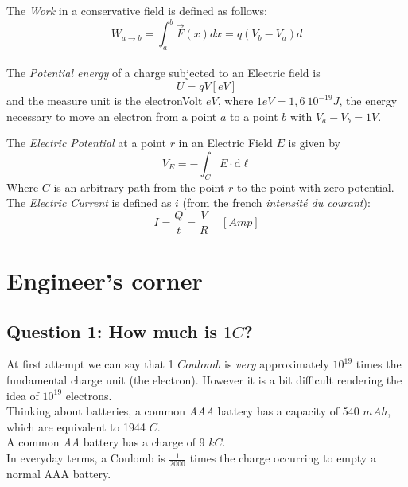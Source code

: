 \documentclass[12pt]{article}
\newcommand{\I}{\textit}
\begin{document}
 The \I{Work} in a conservative field is defined as follows:
		\begin{equation}
			W_{a\to b} = \int_{a}^{b} \overrightarrow{F}(x)dx = q (V_b - V_a)d
		\end{equation}\\
 The \I{Potential energy} of a charge subjected to an Electric field is 
	\begin{equation}
		U = q V [eV]
	\end{equation} and the measure unit is the electronVolt $eV$, where $1 eV = 1,6 \ 10^{-19} J$, the energy necessary to move an electron from a point $a$ to a point $b$ with $V_a-V_b= 1 V$.

The \I{Electric Potential} at a point $r$ in an Electric Field $E$ is given by 
	\begin{equation}
		V_E = -\int_{C}E \cdot \mathrm{d} \boldsymbol{\ell}
	\end{equation}
	Where $C$ is an arbitrary path from the point $r$ to the point with zero potential. \\

 The \I{Electric Current} is defined as $i$ (from the french \I{intensité du courant}):
	\begin{equation}
		I = \frac{Q}{t} = \frac{V}{R} \ \ \ \ \ [Amp]
	\end{equation}





\newpage
\section{Engineer's corner}
\subsection*{Question 1: How much is $1 C$?} 
At first attempt we can say that 1 $Coulomb$ is \I{very} approximately $10^{19}$ times the fundamental charge unit (the electron). However it is a bit difficult rendering the idea of $10^{19}$ electrons. \\
Thinking about batteries, a common \I{AAA} battery has a capacity of 540 $mAh$, which are equivalent to 1944 $C$. \\
A common \I{AA} battery has a charge of 9 $kC$. \\
In everyday terms, a Coulomb is $\frac{1}{2000}$ times the charge occurring to empty a normal AAA battery.
\end{document}
